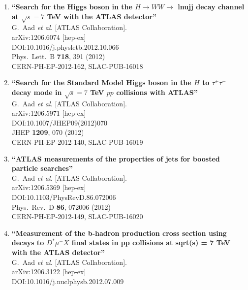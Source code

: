 \documentclass{article}
\begin{document}
\begin{enumerate}
\item%
{\bf ``Search for the Higgs boson in the $H \to W W \to$ lnujj decay channel at $\sqrt{s}=7$ TeV with the ATLAS detector''}
  \\{}G.~Aad {\it et al.} [ATLAS Collaboration].
  \\{}arXiv:1206.6074 [hep-ex]
  \\{}DOI:10.1016/j.physletb.2012.10.066
  \\{}Phys.\ Lett.\ B {\bf 718}, 391 (2012)
  \\{}CERN-PH-EP-2012-162, SLAC-PUB-16018
\item%
{\bf ``Search for the Standard Model Higgs boson in the $H$ to $\tau^{+} \tau^{-}$ decay mode in $\sqrt{s}=7$ TeV $pp$ collisions with ATLAS''}
  \\{}G.~Aad {\it et al.} [ATLAS Collaboration].
  \\{}arXiv:1206.5971 [hep-ex]
  \\{}DOI:10.1007/JHEP09(2012)070
  \\{}JHEP {\bf 1209}, 070 (2012)
  \\{}CERN-PH-EP-2012-140, SLAC-PUB-16019
\item%
{\bf ``ATLAS measurements of the properties of jets for boosted particle searches''}
  \\{}G.~Aad {\it et al.} [ATLAS Collaboration].
  \\{}arXiv:1206.5369 [hep-ex]
  \\{}DOI:10.1103/PhysRevD.86.072006
  \\{}Phys.\ Rev.\ D {\bf 86}, 072006 (2012)
  \\{}CERN-PH-EP-2012-149, SLAC-PUB-16020
\item%
{\bf ``Measurement of the b-hadron production cross section using decays to $D^{*}\mu^-X$ final states in pp collisions at sqrt(s) = 7 TeV with the ATLAS detector''}
  \\{}G.~Aad {\it et al.} [ATLAS Collaboration].
  \\{}arXiv:1206.3122 [hep-ex]
  \\{}DOI:10.1016/j.nuclphysb.2012.07.009

\end{enumerate}
\end{document}
